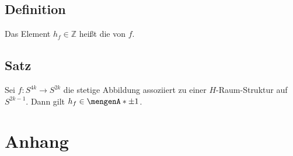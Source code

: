 \subsection{Definition} %
\label{sub:46}
Das Element $h_f \in \mathds{Z}$ heißt die  von $f$.

\subsection{Satz} %
\label{sub:47}
Sei $f\colon S^{4k} \to S^{2k}$ die stetige Abbildung assoziiert zu einer $H$-Raum-Struktur auf $S^{2k-1}$. Dann gilt $h_f \in \set{\pm 1}$.






\cleardoubleoddemptypage
\appendix
\section{Anhang}








